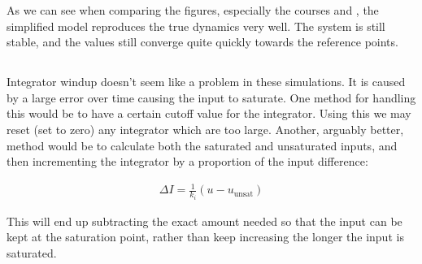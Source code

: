As we can see when comparing the figures, especially the courses  and , the simplified model reproduces the true dynamics very well. The system is still stable, and the values still converge quite quickly towards the reference points. 

\subsection{}
Integrator windup doesn't seem like a problem in these simulations. It is caused by a large error over time causing the input to saturate. One method for handling this would be to have a certain cutoff value for the integrator. Using this we may reset (set to zero) any integrator which are too large. Another, arguably better, method would be to calculate both the saturated and unsaturated inputs, and then incrementing the integrator by a proportion of the input difference: 

\begin{align*}
	\Delta I = \frac{1}{k_i} (u - u_{\text{unsat}})
\end{align*}

This will end up subtracting the exact amount needed so that the input can be kept at the saturation point, rather than keep increasing the longer the input is saturated. 
